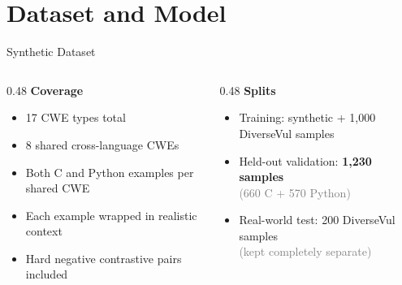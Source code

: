 \documentclass[aspectratio=169]{beamer}
\newcommand{\note}[1]{\textcolor{gray}{#1}}
\begin{document}
\section{Dataset and Model}

\begin{frame}{Synthetic Dataset}
  \begin{columns}
    \begin{column}{0.48\textwidth}
      \textbf{Coverage}
      \begin{itemize}
        \item 17 CWE types total
        \item 8 shared cross-language CWEs
        \item Both C and Python examples per shared CWE
        \item Each example wrapped in realistic context
        \item Hard negative contrastive pairs included
      \end{itemize}
    \end{column}
    \begin{column}{0.48\textwidth}
      \textbf{Splits}
      \begin{itemize}
        \item Training: synthetic + 1{,}000 DiverseVul samples
        \item Held-out validation: \textbf{1{,}230 samples}\\
          \note{(660 C + 570 Python)}
        \item Real-world test: 200 DiverseVul samples\\
          \note{(kept completely separate)}
      \end{itemize}
    \end{column}
  \end{columns}
\end{frame}
\end{document}
